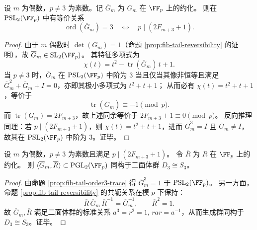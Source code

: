 \begin{proposition}\label{prop:fib-tail-order3-trace}
设 \(m\) 为偶数，\(p\neq 3\) 为素数。记 \(\overline{G}_m\) 为 \(G_m\) 在 \(\FF_p\) 上的约化。
则在 \(\mathrm{PSL}_2(\FF_p)\) 中有等价关系
\[
\operatorname{ord}(\overline{G}_m)=3
\quad\Longleftrightarrow\quad
p\mid(2F_{m+3}+1).
\]
\end{proposition}
\begin{proof}
由于 \(m\) 偶数时 \(\det(G_m)=1\)（命题 \ref{prop:fib-tail-reversibility} 的证明），故 \(\overline{G}_m\in \mathrm{SL}_2(\FF_p)\)。
其特征多项式为
\[
\chi(t)=t^2-\operatorname{tr}(\overline{G}_m)\,t+1.
\]
当 \(p\neq 3\) 时，\(\overline{G}_m\) 在 \(\mathrm{PSL}_2(\FF_p)\) 中阶为 \(3\) 当且仅当其像非恒等且满足
\(
\overline{G}_m^2+\overline{G}_m+I=0
\)，亦即其极小多项式为 \(t^2+t+1\)；
从而必有 \(\chi(t)=t^2+t+1\)，等价于
\[
\operatorname{tr}(\overline{G}_m)\equiv -1\pmod p.
\]
而 \(\operatorname{tr}(G_m)=2F_{m+3}\)，故上述同余等价于 \(2F_{m+3}+1\equiv 0\pmod p\)。
反向推理同理：若 \(p\mid(2F_{m+3}+1)\)，则 \(\chi(t)=t^2+t+1\)，进而 \(\overline{G}_m^3=I\) 且 \(\overline{G}_m\neq I\)，故其在 \(\mathrm{PSL}_2(\FF_p)\) 中阶为 \(3\)。证毕。
\end{proof}

\begin{corollary}\label{cor:fib-tail-s3-closure}
设 \(m\) 为偶数，\(p\neq 3\) 为素数且满足 \(p\mid(2F_{m+3}+1)\)。
令 \(\overline{R}\) 为 \(R\) 在 \(\FF_p\) 上的约化。
则 \(\langle \overline{G}_m,\overline{R}\rangle\subset \mathrm{PGL}_2(\FF_p)\) 同构于二面体群 \(D_3\cong S_3\)。
\end{corollary}
\begin{proof}
由命题 \ref{prop:fib-tail-order3-trace} 得 \(\overline{G}_m^3=1\) 于 \(\mathrm{PSL}_2(\FF_p)\)。
另一方面，命题 \ref{prop:fib-tail-reversibility} 的共轭关系在模 \(p\) 下保持：
\[
\overline{R}\,\overline{G}_m\,\overline{R}^{-1}=\overline{G}_m^{-1},
\qquad
\overline{R}^2=1.
\]
故 \(\overline{G}_m,\overline{R}\) 满足二面体群的标准关系 \(a^3=r^2=1,\,rar=a^{-1}\)，从而生成群同构于 \(D_3\cong S_3\)。证毕。
\end{proof}


